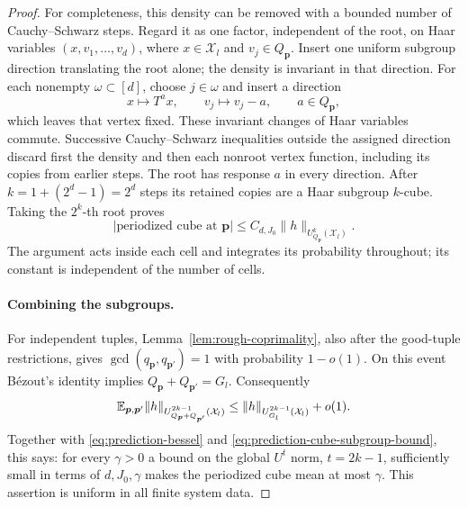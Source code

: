 \begin{proof}
For completeness, this density can be removed with a bounded number
of Cauchy--Schwarz steps.  Regard it as one factor, independent of
the root, on Haar variables $(x,v_1,\ldots,v_d)$, where
$x\in\mathcal X_l$ and $v_j\in Q_{\boldsymbol p}$.
Insert one uniform subgroup direction translating the root alone;
the density is invariant in that direction.  For each nonempty
$\omega\subset[d]$, choose $j\in\omega$ and insert a direction
\[
 x\longmapsto T^a x,\qquad v_j\longmapsto v_j-a,
 \qquad a\in Q_{\boldsymbol p},
\]
which leaves that vertex fixed.  These invariant changes of Haar
variables commute.  Successive Cauchy--Schwarz inequalities outside
the assigned direction discard first the density and then each
nonroot vertex function, including its copies from earlier steps.
The root has response $a$ in every direction.  After
$k=1+(2^d-1)=2^d$ steps its retained copies are a Haar subgroup
$k$-cube.  Taking the $2^k$-th root proves
\begin{equation}\label{eq:prediction-cube-subgroup-bound}
 |\text{periodized cube at }\boldsymbol p|
 \leq C_{d,J_0}\|h\|_{U^k_{Q_{\boldsymbol p}}(\mathcal X_l)}.
\end{equation}
The argument acts inside each cell and integrates its probability
throughout; its constant is independent of the number of cells.

\paragraph{Combining the subgroups.}
For independent tuples, Lemma~\ref{lem:rough-coprimality}, also after
the good-tuple restrictions, gives
$\gcd(q_{\boldsymbol p},q_{\boldsymbol p'})=1$ with probability
$1-o(1)$.  On this event B\'ezout's identity implies
$Q_{\boldsymbol p}+Q_{\boldsymbol p'}=G_l$.  Consequently
\[
 \mathbb E_{\boldsymbol p,\boldsymbol p'}
 \|h\|_{U^{2k-1}_{Q_{\boldsymbol p}+Q_{\boldsymbol p'}}(\mathcal X_l)}
 \leq \|h\|_{U^{2k-1}_{G_l}(\mathcal X_l)}+o(1).
\]
Together with \eqref{eq:prediction-bessel} and
\eqref{eq:prediction-cube-subgroup-bound}, this says: for every
$\gamma>0$ a bound on the global $U^t$ norm, $t=2k-1$, sufficiently
small in terms of $d,J_0,\gamma$ makes the periodized cube mean at
most $\gamma$.  This assertion is uniform in all finite system data.


\end{proof}
